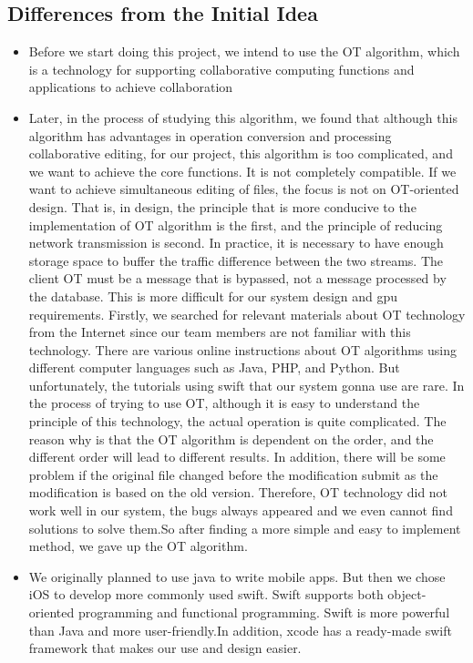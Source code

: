 \subsection{Differences from the Initial Idea}
\begin{itemize}
    \item Before we start doing this project, we intend to use the OT algorithm, which is a technology for supporting collaborative computing functions and applications to achieve collaboration 
    \item Later, in the process of studying this algorithm, we found that although this algorithm has advantages in operation conversion and processing collaborative editing, for our project, this algorithm is too complicated, and we want to achieve the core functions. It is not completely compatible. If we want to achieve simultaneous editing of files, the focus is not on OT-oriented design. That is, in design, the principle that is more conducive to the implementation of OT algorithm is the first, and the principle of reducing network transmission is second. In practice, it is necessary to have enough storage space to buffer the traffic difference between the two streams. The client OT must be a message that is bypassed, not a message processed by the database. This is more difficult for our system design and gpu requirements. Firstly, we searched for relevant materials about OT technology from the Internet since our team members are not familiar with this technology. There are various online instructions about OT algorithms using different computer languages such as Java, PHP, and Python.  But unfortunately, the tutorials using swift that our system gonna use are rare. In the process of trying to use OT, although it is easy to understand the principle of this technology, the actual operation is quite complicated. The reason why is that the OT algorithm is dependent on the order, and the different order will lead to different results. In addition, there will be some problem if the original file changed before the modification submit as the modification is based on the old version. Therefore, OT technology did not work well in our system, the bugs always appeared and we even cannot find solutions to solve them.So after finding a more simple and easy to implement method, we gave up the OT algorithm.
    
    \item We originally planned to use java to write mobile apps. But then we chose iOS to develop more commonly used swift. Swift supports both object-oriented programming and functional programming. Swift is more powerful than Java and more user-friendly.In addition, xcode has a ready-made swift framework that makes our use and design easier.
\end{itemize}



